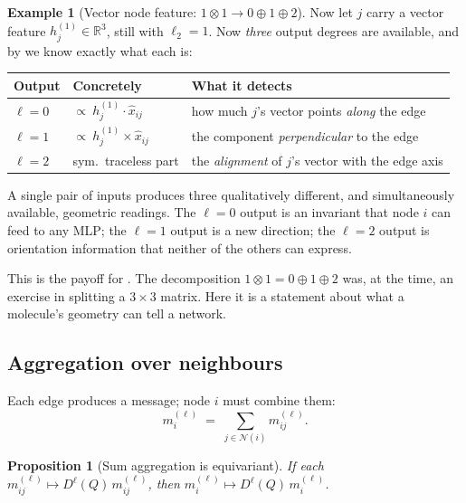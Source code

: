 \documentclass[11pt,a4paper]{report}
\newtheorem{proposition}[proposition]{Proposition}
\theoremstyle{definition}
\newtheorem{example}[example]{Example}
\theoremstyle{remark}
\newcommand{\RR}{\mathbb R}
\begin{document}
\begin{example}[Vector node feature: $1\otimes1\to0\oplus1\oplus2$]
\label{ex:message-vector-node}
Now let $j$ carry a vector feature $h^{(1)}_j\in\RR^3$, still with
$\ell_2=1$. Now \emph{three} output degrees are available, and by
 we know exactly what each is:
\begin{center}
\begin{tabular}{lll}
\toprule
Output & Concretely & What it detects \\
\midrule
$\ell=0$ & $\propto\ h^{(1)}_j\cdot\hat x_{ij}$ & how much $j$'s vector points \emph{along} the edge \\
$\ell=1$ & $\propto\ h^{(1)}_j\times\hat x_{ij}$ & the component \emph{perpendicular} to the edge \\
$\ell=2$ & sym.\ traceless part & the \emph{alignment} of $j$'s vector with the edge axis \\
\bottomrule
\end{tabular}
\end{center}
A single pair of inputs produces three qualitatively different, and
simultaneously available, geometric readings. The $\ell=0$ output is an
invariant that node $i$ can feed to any MLP; the $\ell=1$ output is a new
direction; the $\ell=2$ output is orientation information that neither of
the others can express.

This is the payoff for . The decomposition
$1\otimes1=0\oplus1\oplus2$ was, at the time, an exercise in splitting a
$3\times3$ matrix. Here it is a statement about what a molecule's geometry
can tell a network.
\end{example}

\subsection{Aggregation over neighbours}
\label{sec:aggregation}

Each edge produces a message; node $i$ must combine them:
\begin{equation}
\label{eq:aggregation}
m^{(\ell)}_{i} \;=\; \sum_{j\in\mathcal N(i)} m^{(\ell)}_{ij} .
\end{equation}

\begin{proposition}[Sum aggregation is equivariant]
\label{prop:aggregation-equivariant}
If each $m^{(\ell)}_{ij}\mapsto D^\ell(Q)\,m^{(\ell)}_{ij}$, then
$m^{(\ell)}_{i}\mapsto D^\ell(Q)\,m^{(\ell)}_{i}$.
\end{proposition}
\end{document}
